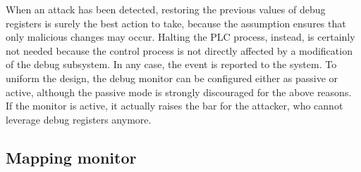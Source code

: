 When an attack has been detected, restoring the previous values of debug registers is surely the best action to take,
because the assumption ensures that only malicious changes may occur.
Halting the PLC process, instead, is certainly not needed because the control process is not directly affected by a modification of the debug subsystem.
In any case, the event is reported to the system. To uniform the design, the debug monitor can be configured either as passive or active,
although the passive mode is strongly discouraged for the above reasons. If the monitor is active, it actually raises the bar for the attacker,
who cannot leverage debug registers anymore.


\subsection{Mapping monitor}
\label{sec:map_design}

